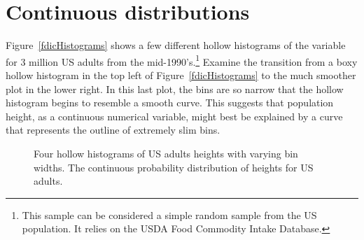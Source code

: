 
\section{Continuous distributions}
\label{contDist}


Figure~\ref{fdicHistograms} shows a few different hollow histograms of the variable  for 3 million US adults from the mid-1990's.\footnote{This sample can be considered a simple random sample from the US population. It relies on the USDA Food Commodity Intake Database.} Examine the transition from a boxy hollow histogram in the top left of Figure~\ref{fdicHistograms} to the much smoother plot in the lower right. In this last plot, the bins are so narrow that the hollow histogram begins to resemble a smooth curve. This suggests that population height, as a continuous numerical variable, might best be explained by a curve that represents the outline of extremely slim bins.

\begin{figure}[h!]
	\centering
	\caption{ Four hollow histograms of US adults heights with varying bin widths.  The continuous probability distribution of heights for US adults.}
\end{figure}

